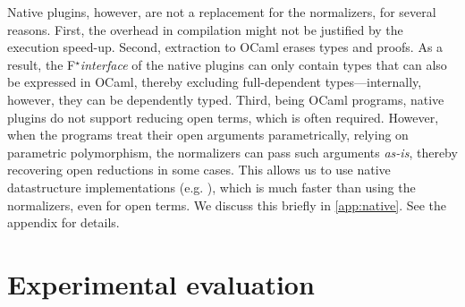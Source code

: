 \documentclass[runningheads]{llncs}
\newcommand\fstar{F$^\star$\xspace}
\newcommand{\comm}[3]{\ifcheckpagebudget\else\ifdraft{{\color{#1}[#2: #3]}}\fi\fi}
\newcommand{\guido}[1]{\comm{blue}{Guido}{#1}}
\begin{document}
Native plugins, however, are not a replacement for the normalizers,
for several reasons.
%
First, the overhead in compilation might not
be justified by the execution speed-up.
%
Second, extraction to OCaml erases types and proofs.
%
As a result, the \fstar \emph{interface} of the native plugins can only
contain types that can also be expressed in OCaml, thereby excluding
full-dependent types---internally, however, they can be dependently typed.
%
Third, being OCaml programs, native plugins do not support reducing
open terms, which is often required.
%
However, when the programs treat their open arguments parametrically,
relying on parametric polymorphism, the normalizers can pass such arguments
\emph{as-is}, thereby recovering open reductions in some cases.
This allows us to
use native datastructure implementations (e.g. ),
which is much faster than using the normalizers, even for open terms.
%
\iffull
We discuss this briefly in
\autoref{app:native}.
\else
See the appendix for details.
\fi


%

%
%





\section{Experimental evaluation}
\label{sec:experiments}
\end{document}
